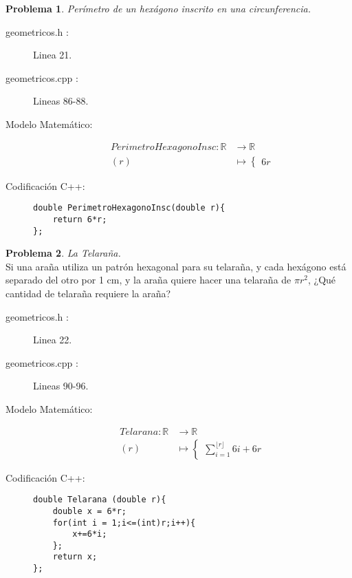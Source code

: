 \documentclass{article}
\theoremstyle{plain}
\theoremstyle{definition}
\newtheorem{problem}{Problema}
\begin{document}
\begin{problem} \emph{Perímetro de un hexágono inscrito en una circunferencia.}\\
\begin{description}
\item[geometricos.h :] Linea 21. \item[geometricos.cpp :] Lineas 86-88.

\item[Modelo Matemático:]
\begin{align*}
PerimetroHexagonoInsc: \mathbb{R} &\to \mathbb{R}\\
(r) &\mapsto \begin{cases}
6r
\end{cases}
\end{align*}
%
\item[Codificación \textsf{C++}:]\hfill
%
\begin{verbatim}
double PerimetroHexagonoInsc(double r){
    return 6*r;
};
\end{verbatim}
\end{description}
\end{problem}

\begin{problem} \emph{La Telaraña.}\\
\hspace*{7mm}Si una araña utiliza un patrón hexagonal para su telaraña, y cada hexágono está separado del otro por 1 cm, y la araña quiere hacer una telaraña de $\pi r^{2}$, ¿Qué cantidad de telaraña requiere la araña?
\begin{description}
\item[geometricos.h :] Linea 22. \item[geometricos.cpp :] Lineas 90-96.

\item[Modelo Matemático:]
\begin{align*}
Telarana: \mathbb{R} &\to \mathbb{R}\\
(r) &\mapsto \begin{cases}
\sum_{i=1}^{\lfloor r \rfloor} 6i + 6r
\end{cases}
\end{align*}
%
\item[Codificación \textsf{C++}:]\hfill
%
\begin{verbatim}
double Telarana (double r){
    double x = 6*r;
    for(int i = 1;i<=(int)r;i++){
        x+=6*i;
    };
    return x;
};
\end{verbatim}
\end{description}
\end{problem}
\end{document}
